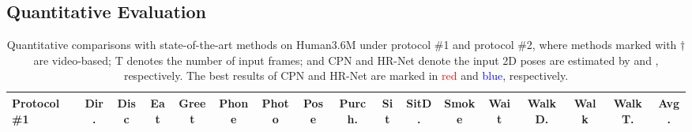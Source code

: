 \documentclass{article}
\begin{document}
\subsection{Quantitative Evaluation}
\begin{table*}
    \scriptsize
    \centering
    \tiny
    \caption{\small Quantitative comparisons with state-of-the-art methods on Human3.6M under protocol \#1 and protocol \#2, where methods marked with $\dag$ are video-based; T denotes the number of input frames; and CPN and HR-Net denote the input 2D poses are estimated by \protect\cite{Chen2018CPN} and \protect\cite{SunXLW19}, respectively. The best results of CPN and HR-Net are marked in \textcolor{red}{red} and \textcolor{blue}{blue}, respectively.}
    \vspace{-0.1in}
    \setlength{\tabcolsep}{2mm}
    {
    \begin{tabular}{l|c|c|c|c|c|c|c|c|c|c|c|c|c|c|c|c}
    \hline
    \textbf{Protocol \#1} & Dir. & Disc & Eat & Greet & Phone & Photo & Pose & Purch. & Sit & SitD. & Smoke & Wait & WalkD. & Walk & WalkT. & Avg. \\ \hline


\end{tabular}}
\end{table*}
\end{document}
